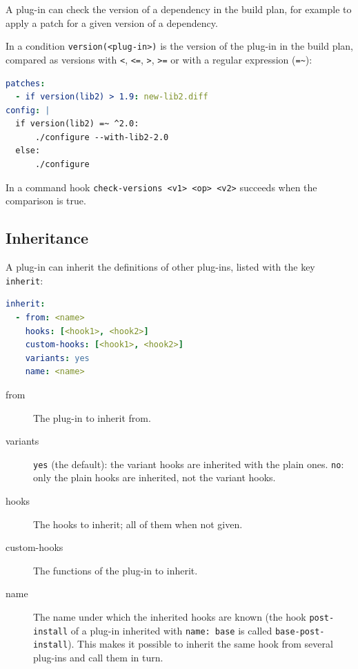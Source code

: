 \documentclass[a4paper,12pt,twoside]{article}
\newcommand{\code}[1]{\texttt{#1}}
\begin{document}
A plug-in can check the version of a dependency in the build plan, for example to apply a patch for a given version of a dependency.

In a condition \code{version(<plug-in>)} is the version of the plug-in in the build plan, compared as versions with \code{<}, \code{<=}, \code{>}, \code{>=} or with a regular expression (\code{=\textasciitilde}):

\begin{lstlisting}[language={yaml}]
patches:
  - if version(lib2) > 1.9: new-lib2.diff
config: |
  if version(lib2) =~ ^2.0:
      ./configure --with-lib2-2.0
  else:
      ./configure
\end{lstlisting}

In a command hook \code{check-versions <v1> <op> <v2>} succeeds when the comparison is true.

\subsection{Inheritance}
\label{inheritance}

A plug-in can inherit the definitions of other plug-ins, listed with the
key \code{inherit}:

\begin{lstlisting}[language={yaml}]
inherit:
  - from: <name>
    hooks: [<hook1>, <hook2>]
    custom-hooks: [<hook1>, <hook2>]
    variants: yes
    name: <name>
\end{lstlisting}

\begin{description}
	\item[from] The plug-in to inherit from.
	\item[variants] \code{yes} (the default): the variant hooks are inherited with the plain ones. \code{no}: only the plain hooks are inherited, not the variant hooks.
	\item[hooks] The hooks to inherit; all of them when not given.
	\item[custom-hooks] The functions of the plug-in to inherit.
	\item[name] The name under which the inherited hooks are known (the hook \code{post-install} of a plug-in inherited with \code{name: base} is called \code{base-post-install}). This makes it possible to inherit the same hook from several plug-ins and call them in turn.
\end{description}
\end{document}
